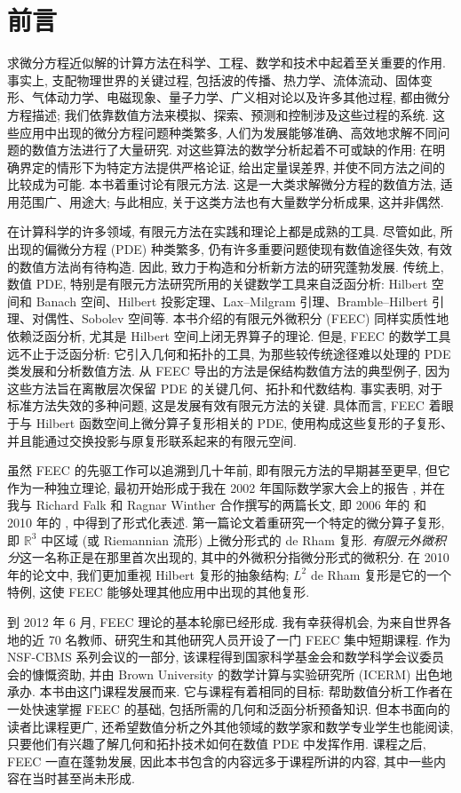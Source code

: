 \chapter*{前言}\label{sec:preface}

求微分方程近似解的计算方法在科学、工程、数学和技术中起着至关重要的作用. 事实上, 支配物理世界的关键过程, 包括波的传播、热力学、流体流动、固体变形、气体动力学、电磁现象、量子力学、广义相对论以及许多其他过程, 都由微分方程描述; 我们依靠数值方法来模拟、探索、预测和控制涉及这些过程的系统. 这些应用中出现的微分方程问题种类繁多, 人们为发展能够准确、高效地求解不同问题的数值方法进行了大量研究. 对这些算法的数学分析起着不可或缺的作用: 在明确界定的情形下为特定方法提供严格论证, 给出定量误差界, 并使不同方法之间的比较成为可能. 本书着重讨论有限元方法. 这是一大类求解微分方程的数值方法, 适用范围广、用途大; 与此相应, 关于这类方法也有大量数学分析成果, 这并非偶然.

在计算科学的许多领域, 有限元方法在实践和理论上都是成熟的工具. 尽管如此, 所出现的偏微分方程 (PDE) 种类繁多, 仍有许多重要问题使现有数值途径失效, 有效的数值方法尚有待构造. 因此, 致力于构造和分析新方法的研究蓬勃发展. 传统上, 数值 PDE, 特别是有限元方法研究所用的关键数学工具来自泛函分析: Hilbert 空间和 Banach 空间、Hilbert 投影定理、Lax–Milgram 引理、Bramble–Hilbert 引理、对偶性、Sobolev 空间等. 本书介绍的有限元外微积分 (FEEC) 同样实质性地依赖泛函分析, 尤其是 Hilbert 空间上闭无界算子的理论. 但是, FEEC 的数学工具远不止于泛函分析: 它引入几何和拓扑的工具, 为那些较传统途径难以处理的 PDE 类发展和分析数值方法. 从 FEEC 导出的方法是保结构数值方法的典型例子, 因为这些方法旨在离散层次保留 PDE 的关键几何、拓扑和代数结构. 事实表明, 对于标准方法失效的多种问题, 这是发展有效有限元方法的关键. 具体而言, FEEC 着眼于与 Hilbert 函数空间上微分算子复形相关的 PDE, 使用构成这些复形的子复形、并且能通过交换投影与原复形联系起来的有限元空间.

虽然 FEEC 的先驱工作可以追溯到几十年前, 即有限元方法的早期甚至更早, 但它作为一种独立理论, 最初开始形成于我在 2002 年国际数学家大会上的报告 , 并在我与 Richard Falk 和 Ragnar Winther 合作撰写的两篇长文, 即 2006 年的  和 2010 年的 , 中得到了形式化表述. 第一篇论文着重研究一个特定的微分算子复形, 即 $\mathbb R^3$ 中区域 (或 Riemannian 流形) 上微分形式的 de Rham 复形. \emph{有限元外微积分}这一名称正是在那里首次出现的, 其中的外微积分指微分形式的微积分. 在 2010 年的论文中, 我们更加重视 Hilbert 复形的抽象结构; $L^2$ de Rham 复形是它的一个特例, 这使 FEEC 能够处理其他应用中出现的其他复形.

到 2012 年 6 月, FEEC 理论的基本轮廓已经形成. 我有幸获得机会, 为来自世界各地的近 70 名教师、研究生和其他研究人员开设了一门 FEEC 集中短期课程. 作为 NSF-CBMS 系列会议的一部分, 该课程得到国家科学基金会和数学科学会议委员会的慷慨资助, 并由 Brown University 的数学计算与实验研究所 (ICERM) 出色地承办. 本书由这门课程发展而来. 它与课程有着相同的目标: 帮助数值分析工作者在一处快速掌握 FEEC 的基础, 包括所需的几何和泛函分析预备知识. 但本书面向的读者比课程更广, 还希望数值分析之外其他领域的数学家和数学专业学生也能阅读, 只要他们有兴趣了解几何和拓扑技术如何在数值 PDE 中发挥作用. 课程之后, FEEC 一直在蓬勃发展, 因此本书包含的内容远多于课程所讲的内容, 其中一些内容在当时甚至尚未形成.

